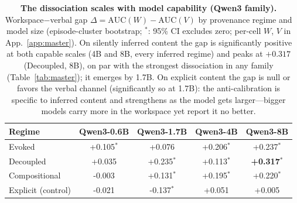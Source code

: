 \begin{table}[t]
\centering
\caption{\textbf{The dissociation scales with model capability (Qwen3 family).}
Workspace$-$verbal gap $\Delta{=}\mathrm{AUC}(W){-}\mathrm{AUC}(V)$ by
provenance regime and model size (episode-cluster bootstrap; $^{*}$: 95\% CI
excludes zero; per-cell $W$, $V$ in App.~\ref{app:master}). On
silently inferred content the gap is significantly positive at both capable
scales (4B and 8B, every inferred regime) and peaks at $+0.317$ (Decoupled,
8B), on par with the strongest dissociation in any family
(Table~\ref{tab:master}); it emerges by 1.7B. On explicit content the gap is null or favors the
verbal channel (significantly so at 1.7B): the anti-calibration is specific to
inferred content and strengthens as the model gets larger---bigger models
carry more in the workspace yet report it no better.}
\label{tab:q3scale}
\small
\begin{tabular}{lcccc}
\toprule
Regime & Qwen3-0.6B & Qwen3-1.7B & Qwen3-4B & Qwen3-8B \\
\midrule
Evoked & +0.105$^{*}$ & +0.076 & +0.206$^{*}$ & +0.237$^{*}$ \\
Decoupled & +0.035 & +0.235$^{*}$ & +0.113$^{*}$ & \textbf{\textcolor{gain}{+0.317$^{*}$}} \\
Compositional & -0.003 & +0.131$^{*}$ & +0.195$^{*}$ & +0.220$^{*}$ \\
\addlinespace
{} Explicit (control) & -0.021 & -0.137$^{*}$ & +0.051 & +0.005 \\
\bottomrule
\end{tabular}
\end{table}
